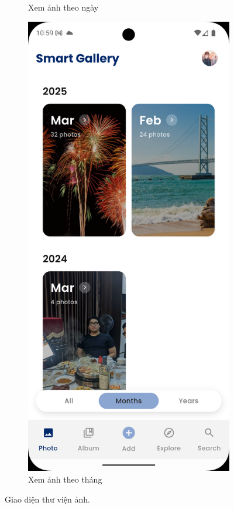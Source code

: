 \begin{figure}[H]
\begin{subfigure}{0.48\textwidth}
        \caption{Xem ảnh theo ngày}
    \end{subfigure}
    \hfill
    \begin{subfigure}{0.48\textwidth}
        \includegraphics[width=1\linewidth]{figures/c4/4-2/gallery_2.png} 
        \caption{Xem ảnh theo tháng}
    \end{subfigure}
    \caption{Giao diện thư viện ảnh.}
    \label{fig:gallery}
\end{figure}

